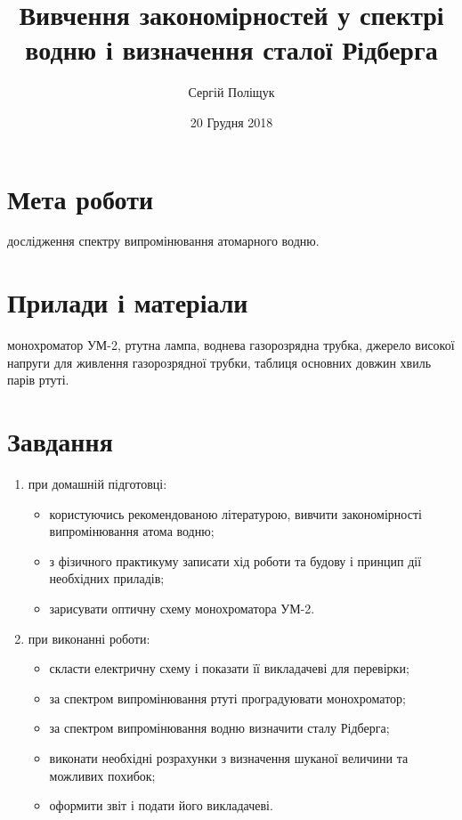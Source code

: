 \documentclass[twocolumn]{el-author}
\date{20 Грудня 2018}
\begin{document}
\title{Вивчення закономірностей у спектрі водню і визначення сталої Рідберга}

\author{Сергій Поліщук}

\maketitle

\section{Мета роботи}

дослідження спектру випромінювання атомарного водню.

\section{Прилади і матеріали}

монохроматор УМ-2, ртутна лампа, воднева
газорозрядна трубка, джерело високої напруги для
живлення газорозрядної трубки, таблиця основних
довжин хвиль парів ртуті.

\section{Завдання}

\begin{enumerate}
	\item при домашній підготовці:
	\begin{itemize}
		\item  користуючись рекомендованою літературою, вивчити
закономірності випромінювання атома водню;
		\item  з фізичного практикуму записати хід роботи та будову і
принцип дії необхідних приладів;
		\item  зарисувати оптичну схему монохроматора УМ-2.
	\end{itemize}
	\item при виконанні роботи:
	\begin{itemize}
		\item  скласти електричну схему і показати її викладачеві для
перевірки;
		\item  за спектром випромінювання ртуті  проградуювати
монохроматор;
		\item  за спектром випромінювання водню визначити сталу
Рідберга;
		\item  виконати необхідні розрахунки з визначення шуканої
величини та можливих похибок;
		\item  оформити звіт і подати його викладачеві.
	\end{itemize}
	
\end{enumerate}
\end{document}
